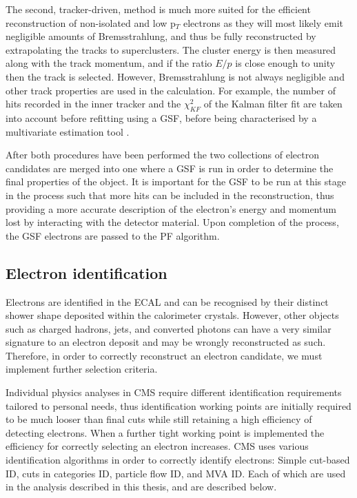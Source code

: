 The second, tracker-driven, method is much more suited for the efficient reconstruction of non-isolated and low p$_T$ electrons as they will most likely emit negligible amounts of Bremsstrahlung, and thus be fully reconstructed by extrapolating the tracks to superclusters. The cluster energy is then measured along with the track momentum, and if the ratio $E/p$ is close enough to unity then the track is selected. However, Bremsstrahlung is not always negligible and other track properties are used in the calculation. For example, the number of hits recorded in the inner tracker and the $\chi^2_{KF}$ of the Kalman filter fit are taken into account before refitting using a GSF, before being characterised by a multivariate estimation tool \cite{Roe2005577}. 

After both procedures have been performed the two collections of electron candidates are merged into one where a GSF is run in order to determine the final properties of the object. It is important for the GSF to be run at this stage in the process such that more hits can be included in the reconstruction, thus providing a more accurate description of the electron's energy and momentum lost by interacting with the detector material. Upon completion of the process, the GSF electrons are passed to the PF algorithm.

\subsection{Electron identification} \label{subsec-ElectronIdentification}

Electrons are identified in the ECAL and can be recognised by their distinct shower shape deposited within the calorimeter crystals. However, other objects such as charged hadrons, jets, and converted photons can have a very similar signature to an electron deposit and may be wrongly reconstructed as such. Therefore, in order to correctly reconstruct an electron candidate, we must implement further selection criteria. 

Individual physics analyses in CMS require different identification requirements tailored to personal needs, thus identification working points are initially required to be much looser than final cuts while still retaining a high efficiency of detecting electrons. When a further tight working point is implemented the efficiency for correctly selecting an electron increases. CMS uses various identification algorithms in order to correctly identify electrons: Simple cut-based ID, cuts in categories ID, particle flow ID, and MVA ID. Each of which are used in the analysis described in this thesis, and are described below.  

